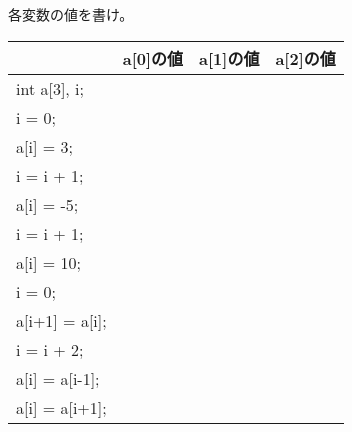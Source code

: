 \documentclass[12pt,a4j]{jarticle}
\newcounter{toi}
\def\toi{%
\bigskip\bigskip\noindent
\addtocounter{toi}{1}
\shadowbox{\bfseries\large 問\thetoi}
\nopagebreak[4]\bigskip\nopagebreak[4]
}
\begin{document}
各変数の値を書け。
\begin{center}
 \ttfamily%
 \begin{tabular}{|l|c|c|c|} \hline
   & a[0]の値 & a[1]の値& a[2]の値\\ \hline\hline
  int a[3], i;& & & \\ \cline{2-4}
  i = 0; & & & \\ \cline{2-4}
  a[i] = 3; & & & \\ \cline{2-4}
  i = i + 1; & & & \\ \cline{2-4}
  a[i] = -5;& & & \\ \cline{2-4}
  i = i + 1; & & & \\ \cline{2-4}
  a[i] = 10;& & & \\ \cline{2-4}
  i = 0; & & & \\ \cline{2-4}
  a[i+1] = a[i]; & & & \\ \cline{2-4}
  i = i + 2; & & & \\ \cline{2-4}
  a[i] = a[i-1]; & & & \\ \cline{2-4}
  a[i] = a[i+1]; & & & \\ \hline
 \end{tabular}
\end{center}





\toi
\end{document}
